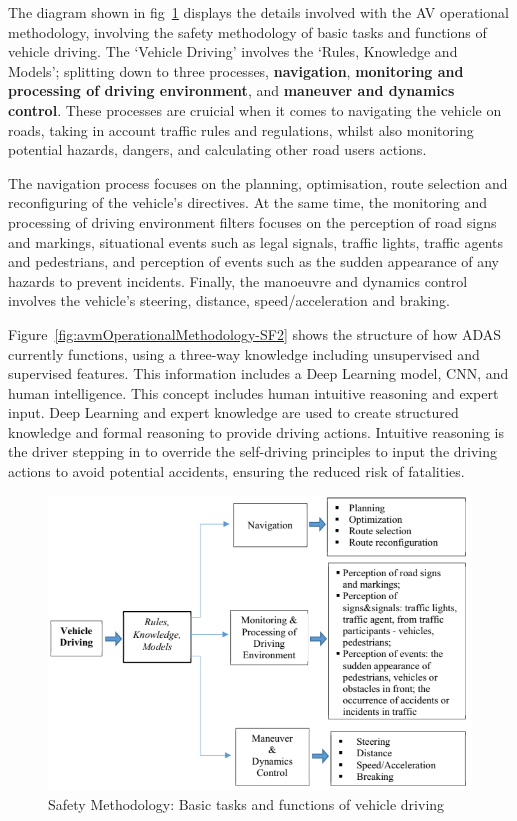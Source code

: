 \documentclass[12pt]{report} %
\begin{document}
		The diagram shown in fig~\ref{fig:avmOperationalMethodology-SF1} displays the details involved with the AV operational methodology, involving the safety methodology of basic tasks and functions of vehicle driving. The `Vehicle Driving' involves the `Rules, Knowledge and Models'; splitting down to three processes, \textbf{navigation}, \textbf{monitoring and processing of driving environment}, and \textbf{maneuver and dynamics control}. These processes are cruicial when it comes to navigating the vehicle on roads, taking in account traffic rules and regulations, whilst also monitoring potential hazards, dangers, and calculating other road users actions.

		The navigation process focuses on the planning, optimisation, route selection and reconfiguring of the vehicle's directives. At the same time, the monitoring and processing of driving environment filters focuses on the perception of road signs and markings, situational events such as legal signals, traffic lights, traffic agents and pedestrians, and perception of events such as the sudden appearance of any hazards to prevent incidents. Finally, the manoeuvre and dynamics control involves the vehicle's steering, distance, speed/acceleration and braking. 

		Figure~\ref{fig:avmOperationalMethodology-SF2} shows the structure of how ADAS currently functions, using a three-way knowledge including unsupervised and supervised features. This information includes a Deep Learning model, CNN, and human intelligence. This concept includes human intuitive reasoning and expert input. Deep Learning and expert knowledge are used to create structured knowledge and formal reasoning to provide driving actions. Intuitive reasoning is the driver stepping in to override the self-driving principles to input the driving actions to avoid potential accidents, ensuring the reduced risk of fatalities.
		\begin{figure}[ht]
			\centering
			\includegraphics[width=.60\columnwidth]{Figures/literature_review/proposal/SystemFunctionality-1.png}
			\caption{Safety Methodology: Basic tasks and functions of vehicle driving~\cite{ionita_autonomous_2017}}
			\label{fig:avmOperationalMethodology-SF1}
		\end{figure}
\end{document}
